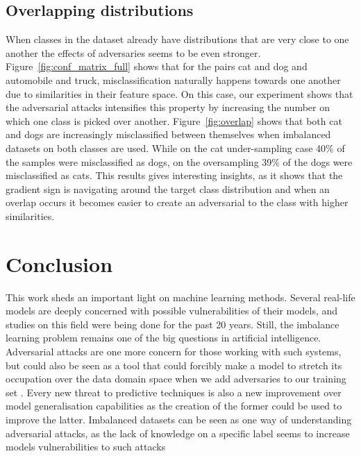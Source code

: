 \documentclass[runningheads,a4paper]{llncs}
\begin{document}
\subsection{Overlapping distributions}
When classes in the dataset already have distributions that are very close to one another the effects of adversaries seems to be even stronger. Figure~\ref{fig:conf_matrix_full} shows that for the pairs cat and dog and automobile and truck, misclassification naturally happens towards one another due to similarities in their feature space. On this case, our experiment shows that the adversarial attacks intensifies this property by increasing the number on which one class is picked over another. Figure~\ref{fig:overlap} shows that both cat and dogs are increasingly misclassified between themselves when imbalanced datasets on both classes are used. While on the cat under-sampling case 40\% of the samples were misclassified as dogs, on the oversampling 39\% of the dogs were misclassified as cats. This results gives interesting insights, as it shows that the gradient sign is navigating around the target class distribution and when an overlap occurs it becomes easier to create an adversarial to the class with higher similarities.


\section{Conclusion}

This work sheds an important light on machine learning methods. Several real-life models are deeply concerned with possible vulnerabilities of their models, and studies on this field were being done for the past 20 years. Still, the imbalance learning problem remains one of the big questions in artificial intelligence. Adversarial attacks are one more concern for those working with such systems, but could also be seen as a tool that could forcibly make a model to stretch its occupation over the data domain space when we add adversaries to our training set \cite{goodfellow2016}. Every new threat to predictive techniques is also a new improvement over model generalisation capabilities as the creation of the former could be used to improve the latter. Imbalanced datasets can be seen as one way of understanding adversarial attacks, as the lack of knowledge on a specific label seems to increase models vulnerabilities to such attacks
\end{document}
